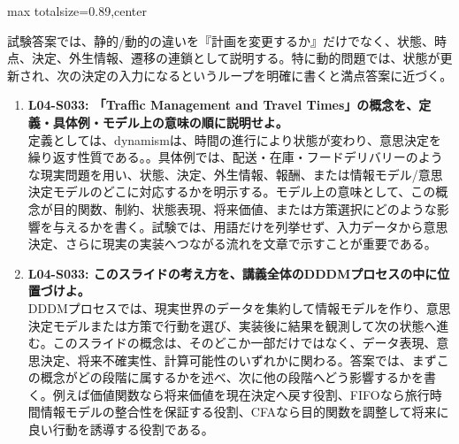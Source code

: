 \begin{minipage}[t]{0.58\textwidth}
\begin{adjustbox}{max totalsize={\textwidth}{0.89\textheight},center}
\begin{minipage}{\textwidth}
試験答案では、静的/動的の違いを『計画を変更するか』だけでなく、状態、時点、決定、外生情報、遷移の連鎖として説明する。特に動的問題では、状態が更新され、次の決定の入力になるというループを明確に書くと満点答案に近づく。\par{}\begin{enumerate}\item \textbf{L04-S033: 「Traffic Management and Travel Times」の概念を、定義・具体例・モデル上の意味の順に説明せよ。}\\定義としては、dynamismは、時間の進行により状態が変わり、意思決定を繰り返す性質である。。具体例では、配送・在庫・フードデリバリーのような現実問題を用い、状態、決定、外生情報、報酬、または情報モデル/意思決定モデルのどこに対応するかを明示する。モデル上の意味として、この概念が目的関数、制約、状態表現、将来価値、または方策選択にどのような影響を与えるかを書く。試験では、用語だけを列挙せず、入力データから意思決定、さらに現実の実装へつながる流れを文章で示すことが重要である。\item \textbf{L04-S033: このスライドの考え方を、講義全体のDDDMプロセスの中に位置づけよ。}\\DDDMプロセスでは、現実世界のデータを集約して情報モデルを作り、意思決定モデルまたは方策で行動を選び、実装後に結果を観測して次の状態へ進む。このスライドの概念は、そのどこか一部だけではなく、データ表現、意思決定、将来不確実性、計算可能性のいずれかに関わる。答案では、まずこの概念がどの段階に属するかを述べ、次に他の段階へどう影響するかを書く。例えば価値関数なら将来価値を現在決定へ戻す役割、FIFOなら旅行時間情報モデルの整合性を保証する役割、CFAなら目的関数を調整して将来に良い行動を誘導する役割である。\end{enumerate}
\end{minipage}
\end{adjustbox}
\end{minipage}


